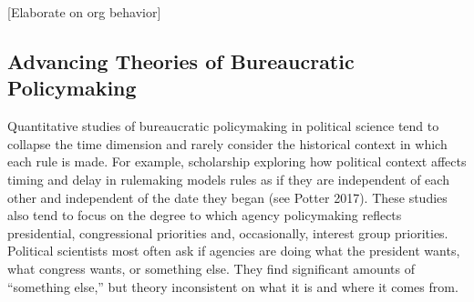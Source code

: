 


[Elaborate on org behavior]

\subsection{Advancing Theories of Bureaucratic Policymaking}

Quantitative studies of bureaucratic policymaking in political science tend to collapse the time dimension and rarely consider the historical context in which each rule is made. For example, scholarship exploring how political context affects timing and delay in rulemaking models rules as if they are independent of each other and independent of the date they began (see Potter 2017). These studies also tend to focus on the degree to which agency policymaking reflects presidential, congressional priorities and, occasionally, interest group priorities. Political scientists most often ask if agencies are doing what the president wants, what congress wants, or something else. They find significant amounts of ``something else,'' but theory inconsistent on what it is and where it comes from. 






